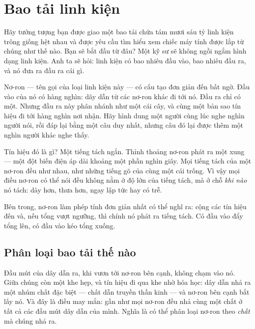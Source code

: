 \chapter{Bao tải linh kiện}


Hãy tưởng tượng bạn được giao một bao tải chứa tám mươi sáu tỷ linh kiện trông giống hệt nhau và được yêu cầu tìm hiểu xem chiếc máy tính được lắp từ chúng như thế nào. Bạn sẽ bắt đầu từ đâu? Một kỹ sư sẽ không ngồi ngắm hình dạng linh kiện. Anh ta sẽ hỏi: linh kiện có bao nhiêu đầu vào, bao nhiêu đầu ra, và nó đưa ra đầu ra cái gì.

Nơ-ron --- tên gọi của loại linh kiện này --- có cấu tạo đơn giản đến bất ngờ. Đầu vào của nó có hàng nghìn: dây dẫn từ các nơ-ron khác đi tới nó. Đầu ra chỉ có một. Nhưng đầu ra này phân nhánh như một cái cây, và cùng một bản sao tín hiệu đi tới hàng nghìn nơi nhận. Hãy hình dung một người cùng lúc nghe nghìn người nói, rồi đáp lại bằng một câu duy nhất, nhưng câu đó lại được thêm một nghìn người khác nghe thấy.

Tín hiệu đó là gì? Một tiếng tách ngắn. Thỉnh thoảng nơ-ron phát ra một xung --- một đột biến điện áp dài khoảng một phần nghìn giây. Mọi tiếng tách của một nơ-ron đều như nhau, như những tiếng gõ của cùng một cái trống. Vì vậy mọi điều nơ-ron có thể nói đều không nằm ở độ lớn của tiếng tách, mà ở chỗ \emph{khi nào} nó tách: dày hơn, thưa hơn, ngay lập tức hay có trễ.

Bên trong, nơ-ron làm phép tính đơn giản nhất có thể nghĩ ra: cộng các tín hiệu đến và, nếu tổng vượt ngưỡng, thì chính nó phát ra tiếng tách. Có đầu vào đẩy tổng lên, có đầu vào kéo tổng xuống.

\section*{Phân loại bao tải thế nào}

Đầu mút của dây dẫn ra, khi vươn tới nơ-ron bên cạnh, không chạm vào nó. Giữa chúng còn một khe hẹp, và tín hiệu đi qua khe nhờ hóa học: dây dẫn nhả ra một nhúm chất đặc biệt --- chất dẫn truyền thần kinh --- và nơ-ron bên cạnh bắt lấy nó. Và đây là điều may mắn: gần như mọi nơ-ron đều nhả cùng một chất ở tất cả các đầu mút dây dẫn của mình. Nghĩa là có thể phân loại nơ-ron theo \emph{chất} mà chúng nhả ra.

